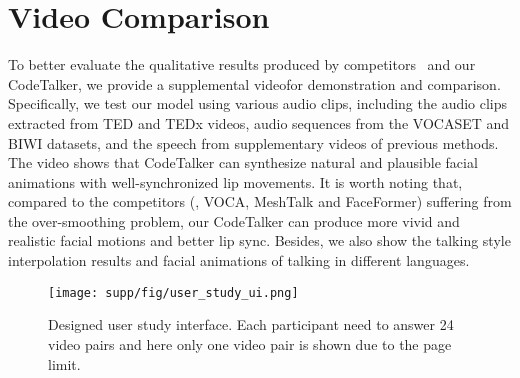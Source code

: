 \section{Video Comparison}
\label{sec:video}
To better evaluate the qualitative results produced by competitors~\cite{richard2021meshtalk,cudeiro2019capture,fan2022faceformer,karras2017audio} and our CodeTalker, we provide a supplemental video\footnotemark[1] for demonstration and comparison. Specifically, we test our model using various audio clips, including the audio clips extracted from TED and TEDx videos, audio sequences from the VOCASET and BIWI datasets, and the speech from supplementary videos of previous methods. The video shows that CodeTalker can synthesize natural and plausible facial animations with well-synchronized lip movements. It is worth noting that, compared to the competitors (\ie, VOCA, MeshTalk and FaceFormer) suffering from the over-smoothing problem, our CodeTalker can produce more vivid and realistic facial motions and better lip sync. Besides, we also show the talking style interpolation results and facial animations of talking in different languages.






\begin{figure*}[!t]
    \centering
    \texttt{[image: supp/fig/user\_study\_ui.png]}
    \caption{Designed user study interface. Each participant need to answer 24 video pairs and here only one video pair is shown due to the page limit.}
    \label{fig:user_study}
\end{figure*}








